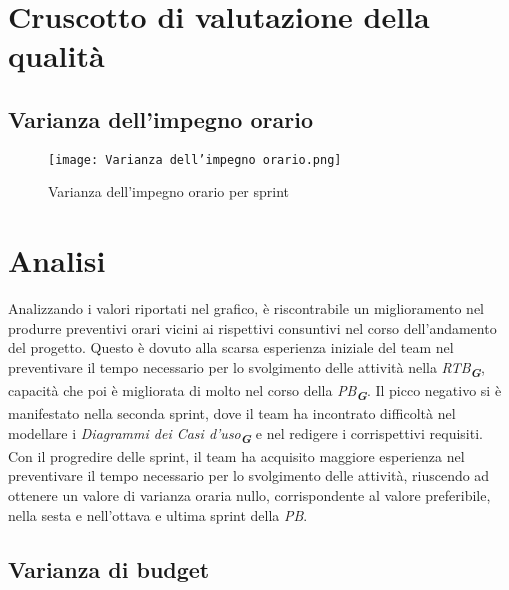 

\section{Cruscotto di valutazione della qualità}
\label{sec:Cruscotto di valutazione della qualità}

\vspace{0.5cm}

\subsection{Varianza dell'impegno orario}
\label{subsec:Varianza dell'impegno orario}

\begin{figure}[h] 
    \centering
    \texttt{[image: Varianza dell'impegno orario.png]}
    \caption{Varianza dell'impegno orario per sprint}
    \label{fig: Varianza dell'impegno orario}
\end{figure}

\section*{Analisi}

Analizzando i valori riportati nel grafico, è riscontrabile un miglioramento nel produrre
preventivi orari vicini ai rispettivi consuntivi nel corso dell'andamento del progetto. Questo è dovuto alla scarsa esperienza iniziale del team
nel preventivare il tempo necessario per lo svolgimento delle attività nella \emph{RTB}\textsubscript{\textbf{\textit{G}}}, capacità che poi è migliorata di molto nel corso della \emph{PB}\textsubscript{\textbf{\textit{G}}}. Il picco negativo si è manifestato nella seconda sprint, dove il team ha incontrato difficoltà
nel modellare i \emph{Diagrammi dei Casi d'uso}\textsubscript{\textbf{\textit{G}}} e nel redigere i corrispettivi requisiti.
Con il progredire delle sprint, il team ha acquisito maggiore esperienza nel preventivare
il tempo necessario per lo svolgimento delle attività, riuscendo ad ottenere un valore di varianza oraria nullo, corrispondente al valore preferibile, nella sesta e nell'ottava e ultima sprint della \emph{PB}.

\newpage

\subsection{Varianza di budget}
\label{subsec:Varianza di budget}


